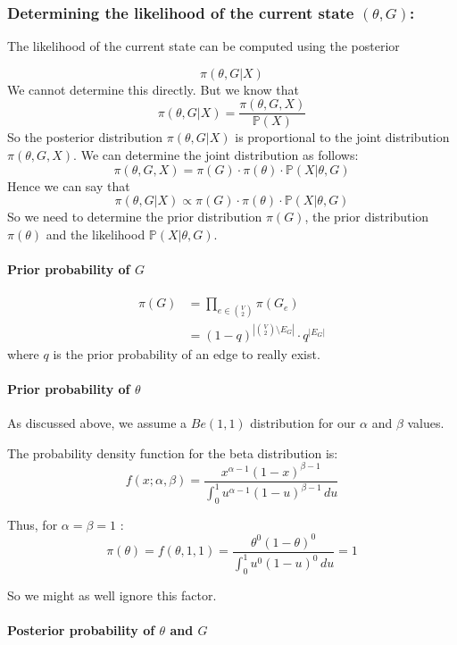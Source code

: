 \documentclass{scrartcl}
\newcommand{\prob}{\mathbb{P}}
\begin{document}
\subsubsection{Determining the likelihood of the current state $(\theta,G)$:}

The likelihood of the current state can be computed using the posterior 

$$\pi(\theta,G|X)$$
We cannot determine this directly. But we know that 
$$ \pi(\theta,G|X) = \frac{\pi(\theta,G,X)}{\prob(X)} $$
So the posterior distribution $\pi(\theta,G|X)$ is proportional to the joint distribution $\pi(\theta,G,X)$. We can determine the joint distribution as follows:
$$ \pi(\theta,G,X) = \pi(G)\cdot\pi(\theta)\cdot\prob(X|\theta,G) $$
Hence we can say that $$ \pi(\theta,G|X) \propto \pi(G)\cdot\pi(\theta)\cdot\prob(X|\theta,G) $$
So we need to determine the prior distribution $\pi(G)$, the prior distribution $\pi(\theta)$ and the likelihood $\prob(X|\theta,G)$.

\paragraph{Prior probability of $G$}
\begin{align*}
  \pi(G) &= \prod_{e \in \binom{V}{2}} \pi(G_e) \\
         &= (1-q)^{\left |\binom{V}{2}\setminus E_G \right |} \cdot q^{|E_G|}
\end{align*}
where $q$ is the prior probability of an edge to really exist.

\paragraph{Prior probability of $\theta$}

As discussed above, we assume a $Be(1,1)$ distribution for our $\alpha$ and $\beta$ values. 

The probability density function for the beta distribution is:
$$ f(x;\alpha,\beta) = \frac{x^{\alpha-1}(1-x)^{\beta-1}}{\int_0^1 u^{\alpha-1} (1-u)^{\beta-1}\, du} $$

Thus, for $\alpha = \beta = 1$ :
$$ \pi(\theta) = f(\theta,1,1) = \frac{\theta^{0}(1-\theta)^{0}}{\int_0^1 u^{0} (1-u)^{0}\, du} = 1$$

So we might as well ignore this factor.

\paragraph{Posterior probability of $\theta$ and $G$}
\end{document}
